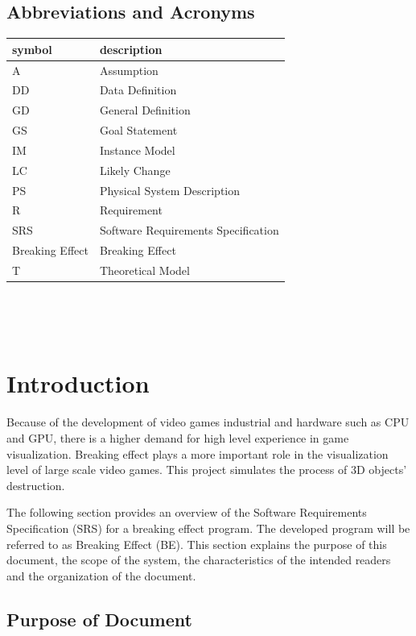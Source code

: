 \documentclass[12pt]{article}
\newcommand{\progname}{Breaking Effect} %
\begin{document}
\subsection{Abbreviations and Acronyms}

\renewcommand{\arraystretch}{1.2}
\begin{tabular}{l l} 
  \toprule		
  \textbf{symbol} & \textbf{description}\\
  \midrule 
  A & Assumption\\
  DD & Data Definition\\
  GD & General Definition\\
  GS & Goal Statement\\
  IM & Instance Model\\
  LC & Likely Change\\
  PS & Physical System Description\\
  R & Requirement\\
  SRS & Software Requirements Specification\\
  \progname{} & Breaking Effect\\
  T & Theoretical Model\\
  \bottomrule
\end{tabular}\\

\newpage

\tableofcontents

~\newpage


\section{Introduction}

Because of the development of video games industrial and hardware such as CPU and GPU, there is a higher demand for high level experience in game visualization. Breaking effect plays a more important role in the visualization level of large scale video games. This project simulates the process of 3D objects’ destruction.

The following section provides an overview of the Software Requirements Specification (SRS) for a breaking effect program. The developed program will be referred to as Breaking Effect (BE). This section explains the purpose of this document, the scope of the system, the characteristics of the intended readers and the organization of the document.

\subsection{Purpose of Document}
\end{document}
